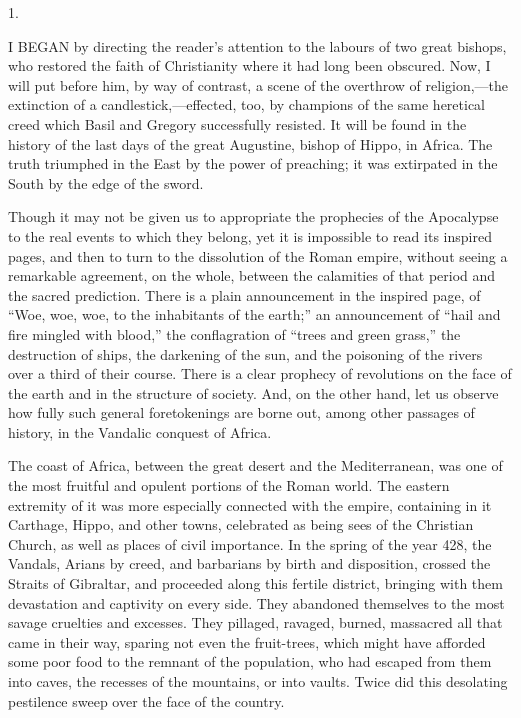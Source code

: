1.

I BEGAN by directing the reader's attention
to the labours of two great bishops, who restored the faith of
Christianity where it had long been obscured. Now, I will put before
him, by way of contrast, a scene of the overthrow of religion,—the
extinction of a candlestick,—effected, too, by champions of the same
heretical creed which Basil and Gregory successfully resisted. It will
be found in the history of the last days of the great Augustine,
bishop of Hippo, in Africa. The truth triumphed in the East by the
power of preaching; it was extirpated in the South by the edge of the
sword.

Though it may not be given us to appropriate the prophecies of the
Apocalypse to the real events to which they belong, yet it is
impossible to read its inspired pages, and then to turn to the
dissolution of the Roman empire, without seeing a remarkable
agreement, on the whole, between the calamities of that period and the
sacred prediction. There is a plain announcement in the inspired page,
of ``Woe, woe, woe, to the inhabitants of the earth;''
an announcement of ``hail and fire mingled with blood,'' the
conflagration of ``trees and green grass,'' the destruction of
ships, the darkening of the sun, and the poisoning of the rivers over
a third of their course. There is a clear prophecy of revolutions on
the face of the earth and in the structure of society. And, on the
other hand, let us observe how fully such general foretokenings are
borne out, among other passages of history, in the Vandalic conquest
of Africa.

The coast of Africa, between the great desert and the
Mediterranean, was one of the most fruitful and opulent portions of
the Roman world. The eastern extremity of it was more especially
connected with the empire, containing in it Carthage, Hippo, and other
towns, celebrated as being sees of the Christian Church, as well as
places of civil importance. In the spring of the year 428, the
Vandals, Arians by creed, and barbarians by birth and disposition,
crossed the Straits of Gibraltar, and proceeded along this fertile
district, bringing with them devastation and captivity on every side.
They abandoned themselves to the most savage cruelties and excesses.
They pillaged, ravaged, burned, massacred all that came in their way,
sparing not even the fruit-trees, which might have afforded some poor
food to the remnant of the population, who had escaped from them into
caves, the recesses of the mountains, or into vaults. Twice did this
desolating pestilence sweep over the face of the country.


